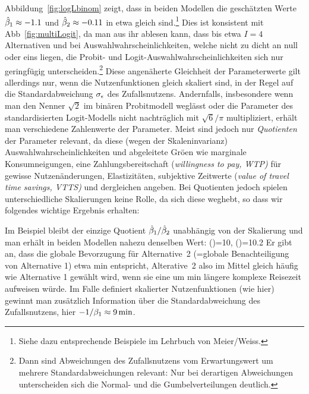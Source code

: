 %
Abbildung~\ref{fig:logLbinom} zeigt, dass in beiden Modellen die
gesch\"atzten Werte $\hat{\beta}_1\approx -1.1$ und $\hat{\beta}_2 \approx -0.11$
in etwa gleich sind.\footnote{Siehe dazu entsprechende Beispiele im
  Lehrbuch von Meier/Weiss.}
 Dies ist konsistent mit Abb~\ref{fig:multiLogit},
da man aus ihr ablesen kann, dass bis etwa $I=4$ Alternativen und bei
Auswahlwahrscheinlichkeiten, welche nicht zu dicht an null oder eins
liegen, die 
Probit- und Logit-Auswahl\-wahr\-schein\-lich\-kei\-ten sich nur
geringf\"ugig 
unterscheiden.\footnote{Dann sind Abweichungen des Zufallsnutzens vom
Erwartungswert um mehrere Standardabweichungen relevant: Nur bei
derartigen Abweichungen unterscheiden sich die Normal- und die
Gumbelverteilungen deutlich.}
 Diese angen\"aherte Gleichheit der Parameterwerte
 gilt allerdings nur, wenn die Nutzenfunktionen gleich
skaliert sind, in der Regel  auf die Standardabweichung $\sigma_{\epsilon}$ des
Zufallsnutzens. Andernfalls, insbesondere wenn man den Nenner
$\sqrt{2}$ im bin\"aren Probitmodell wegl\"asst oder die Parameter des
standardisierten Logit-Modells nicht nachtr\"aglich mit $\sqrt{6}/\pi$
multipliziert, erh\"alt man 
verschiedene Zahlenwerte der Parameter.
 Meist sind jedoch nur \emph{Quotienten}
der Parameter relevant, da diese (wegen der Skaleninvarianz)
Auswahlwahrscheinlichkeiten 
und abgeleitete Gr\"o\3en wie marginale Konsumneigungen, eine
Zahlungsbereitschaft (\emph{willingness to pay, WTP)} f\"ur gewisse Nutzen\"anderungen, 
Elastizit\"aten, subjektive Zeitwerte (\emph{value of travel time
  savings, VTTS)} und dergleichen
angeben. Bei Quotienten jedoch spielen unterschiedliche Skalierungen
keine Rolle, da sich diese weghebt, so dass wir folgendes wichtige
Ergebnis erhalten:

%
 Im Beispiel bleibt der einzige Quotient $\hat{\beta}_1/\hat{\beta}_2$ 
unabh\"angig von der Skalierung und man erh\"alt in beiden Modellen nahezu denselben Wert:
\bdm
\left(\right)=10, \quad
\left(\right)=10.2
\edm
 Er gibt
an, dass die globale Bevorzugung f\"ur Alternative~2 (=globale
Benachteiligung von Alternative 1) etwa
\unit[10]{min} entspricht, Alterative~2 also im Mittel gleich h\"aufig
wie Alternative 1 gew\"ahlt wird, wenn sie eine um \unit[10]{min}
l\"angere komplexe Reisezeit aufweisen w\"urde.
Im Falle definiert skalierter Nutzenfunktionen (wie hier) gewinnt man
zus\"atzlich Information \"uber die Standardabweichung des
Zufallsnutzens, hier $-1/\beta_1 \approx \unit[9]{min}$.






